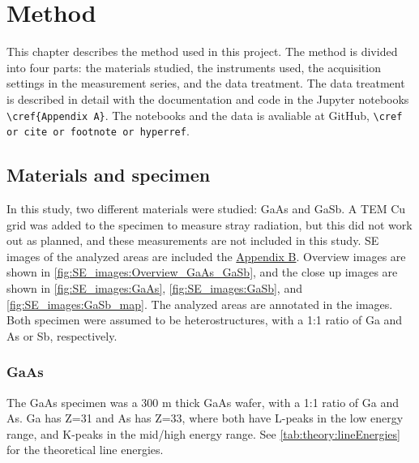 \chapter{Method}
\label{ch:method}


This chapter describes the method used in this project.
The method is divided into four parts: the materials studied, the instruments used, the acquisition settings in the measurement series, and the data treatment.
The data treatment is described in detail with the documentation and code in the Jupyter notebooks \verb|\cref{Appendix A}|.
The notebooks and the data is avaliable at GitHub, \verb|\cref or cite or footnote or hyperref|.










\section{Materials and specimen}
\label{method:materials}

In this study, two different materials were studied: GaAs and GaSb.
A TEM Cu grid was added to the specimen to measure stray radiation, but this did not work out as planned, and these measurements are not included in this study.
SE images of the analyzed areas are included the \hyperref[appendix:SE_images]{Appendix B}.
Overview images are shown in \cref{fig:SE_images:Overview_GaAs_GaSb}, and the close up images are shown in \cref{fig:SE_images:GaAs}, \cref{fig:SE_images:GaSb}, and \cref{fig:SE_images:GaSb_map}.
The analyzed areas are annotated in the images.
Both specimen were assumed to be heterostructures, with a 1:1 ratio of Ga and As or Sb, respectively.


\subsection{GaAs}
\label{method:materials:gaas}

The GaAs specimen was a 300 \textmu m thick GaAs wafer, with a 1:1 ratio of Ga and As.
Ga has Z=31 and As has Z=33, where both have L-peaks in the low energy range, and K-peaks in the mid/high energy range.
See \cref{tab:theory:lineEnergies} for the theoretical line energies.

